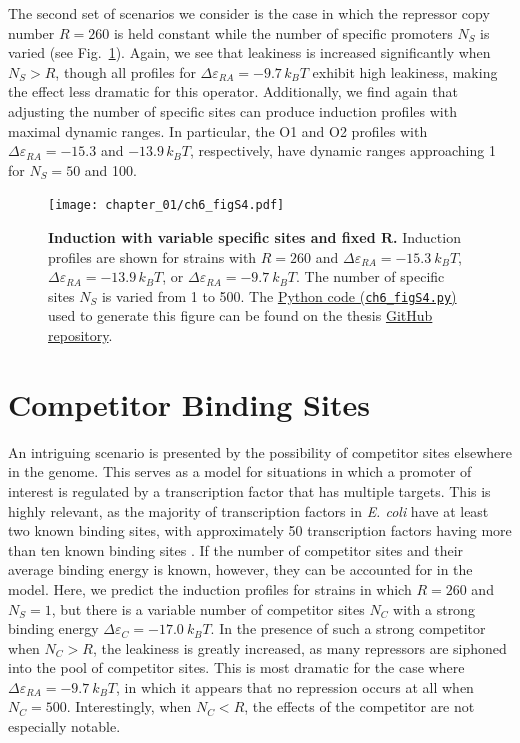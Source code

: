 \documentclass[12pt]{caltech_thesis}
\begin{document}
The second set of scenarios we consider is the case in which the
repressor copy number \(R=260\) is held constant while the number of
specific promoters \(N_S\) is varied (see Fig.~\ref{fig:fugacity_Ns}).
Again, we see that leakiness is increased significantly when
\(N_S > R\), though all profiles for
\(\Delta \varepsilon_{RA} = -9.7\, k_BT\) exhibit high leakiness, making
the effect less dramatic for this operator. Additionally, we find again
that adjusting the number of specific sites can produce induction
profiles with maximal dynamic ranges. In particular, the O1 and O2
profiles with \(\Delta \varepsilon_{RA} = -15.3\) and \(-13.9\, k_BT\),
respectively, have dynamic ranges approaching 1 for \(N_S = 50\) and
100.

\hypertarget{fig:fugacity_Ns}{%
\begin{figure}
\centering
\texttt{[image: chapter\_01/ch6\_figS4.pdf]}
\caption[{Induction with variable specific sites and fixed
\(\boldsymbol{R}\).}]{\textbf{Induction with variable specific sites and
fixed \(\boldsymbol{R}\).} Induction profiles are shown for strains with
\(R=260\) and \(\Delta \varepsilon_{RA} = -15.3~k_BT\),
\(\Delta \varepsilon_{RA} = -13.9\,k_BT\), or
\(\Delta \varepsilon_{RA} = -9.7~k_BT\). The number of specific sites
\(N_S\) is varied from 1 to 500. The
\href{https://github.com/gchure/phd/blob/master/src/chapter_06/code/ch6_figS4.py}{Python
code (\texttt{ch6\_figS4.py})} used to generate this figure can be found
on the thesis \href{https://github.com/gchure/phd}{GitHub repository}.}
\label{fig:fugacity_Ns}
\end{figure}
}

\hypertarget{competitor-binding-sites}{%
\section{Competitor Binding Sites}\label{competitor-binding-sites}}

An intriguing scenario is presented by the possibility of competitor
sites elsewhere in the genome. This serves as a model for situations in
which a promoter of interest is regulated by a transcription factor that
has multiple targets. This is highly relevant, as the majority of
transcription factors in \emph{E. coli} have at least two known binding
sites, with approximately 50 transcription factors having more than ten
known binding sites \autocite{rydenfelt2014,schmidt2016}. If the number
of competitor sites and their average binding energy is known, however,
they can be accounted for in the model. Here, we predict the induction
profiles for strains in which \(R=260\) and \(N_S=1\), but there is a
variable number of competitor sites \(N_C\) with a strong binding energy
\(\Delta \varepsilon_C = -17.0~k_BT\). In the presence of such a strong
competitor when \(N_C > R\), the leakiness is greatly increased, as many
repressors are siphoned into the pool of competitor sites. This is most
dramatic for the case where \(\Delta \varepsilon_{RA} = -9.7~k_B T\), in
which it appears that no repression occurs at all when \(N_C = 500\).
Interestingly, when \(N_C < R\), the effects of the competitor are not
especially notable.
\end{document}
